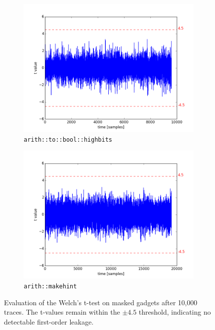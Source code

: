 \begin{figure}[h]
\begin{subfigure}[b]{0.45\textwidth}
        \includegraphics[width=\textwidth]{../figures/arith_to_bool_highbits_10000_traces.png}
        \caption{\texttt{arith::to::bool::highbits}}
        \label{fig:arith_to_bool_highbits}
    \end{subfigure}
    \hfill
    \begin{subfigure}[b]{0.45\textwidth}
        \includegraphics[width=\textwidth]{../figures/arith_makehint_10000_traces.png}
        \caption{\texttt{arith::makehint}}
        \label{fig:arith_makehint}
    \end{subfigure}
    \caption{Evaluation of the Welch's t-test on masked gadgets after 10,000 traces. The t-values remain within the $\pm4.5$ threshold, indicating no detectable first-order leakage.}
    \label{fig:t-test-masked}
\end{figure}

